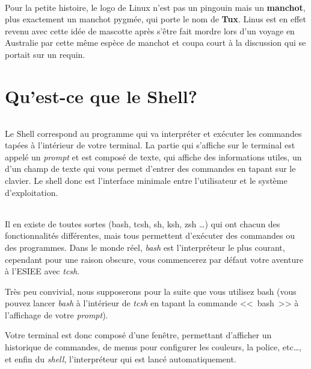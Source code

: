 \documentclass[french, a4paper, 12pt, titlepage]{article}
\begin{document}
\paragraph{}
Pour la petite histoire, le logo de Linux n'est pas un pingouin mais un
\textbf{manchot}, plus exactement un manchot pygmée, qui porte le nom de
\textbf{Tux}. Linus est en effet revenu avec cette idée de mascotte après
s'être fait mordre lors d'un voyage en Australie par cette même espèce de
manchot et coupa court à la discussion qui se portait sur un requin.

\part{Qu'est-ce que le Shell?}

\paragraph{}
Le Shell correspond au programme qui va interpréter et exécuter les commandes
tapées à l'intérieur de votre terminal. La partie qui s'affiche sur le terminal
est appelé un \emph{prompt} et est composé de texte, qui affiche des
informations utiles, un d'un champ de texte qui vous permet d'entrer des
commandes en tapant sur le clavier. Le shell donc est l'interface minimale
entre l'utilisateur et le système d'exploitation.

\paragraph{} Il en existe de toutes sortes (bash, tcsh, sh, ksh, zsh \dots) qui
ont chacun des fonctionnalités différentes, mais tous permettent d'exécuter des
commandes ou des programmes. Dans le monde réel, \emph{bash} est l'interpréteur
le plus courant, cependant pour une raison obscure, vous commencerez par défaut
votre aventure à l'ESIEE avec \emph{tcsh}.

Très peu convivial, nous supposerons pour la suite que vous utilisez bash (vous
pouvez lancer \emph{bash} à l'intérieur de \emph{tcsh} en tapant la commande
<<~bash~>> à l'affichage de votre \emph{prompt}).

Votre terminal est donc composé d'une fenêtre, permettant d'afficher un
historique de commandes, de menus pour configurer les couleurs, la police,
etc\dots, et enfin du \emph{shell}, l'interpréteur qui est lancé
automatiquement.
\end{document}
